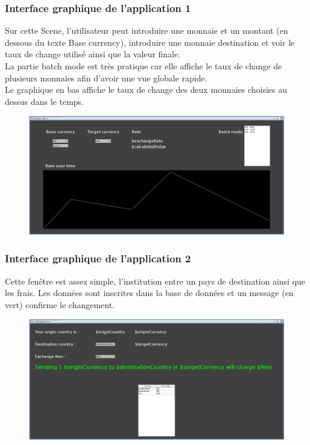 \documentclass[../rapport.tex]{subfiles}
\begin{document}
\subsubsection{Interface graphique de l'application 1}
Sur cette Scene, l'utilisateur peut introduire une monnaie et un montant (en dessous du texte Base currency), introduire une monnaie destination et voir le taux de change utilisé ainsi que la valeur finale. \\
La partie batch mode est très pratique car elle affiche le taux de change de plusieurs monnaies afin d'avoir une vue globale rapide. \\
Le graphique en bas affiche le taux de change des deux monnaies choisies au dessus dans le temps.
\begin{figure}[H]
    \includegraphics[scale=0.2]{ressources/photos_diagrammes/extensionUgo/ExchangeRateScene.jpg}
\end{figure}

\subsubsection{Interface graphique de l'application 2}
Cette fenêtre est assez simple, l'institution entre un pays de destination ainsi que les frais. Les données sont inscrites dans la base de données et un message (en vert) confirme le changement.
\begin{figure}[H]
    \includegraphics[scale=0.2]{ressources/photos_diagrammes/extensionUgo/setFeesScene.jpg}
\end{figure}
\end{document}
